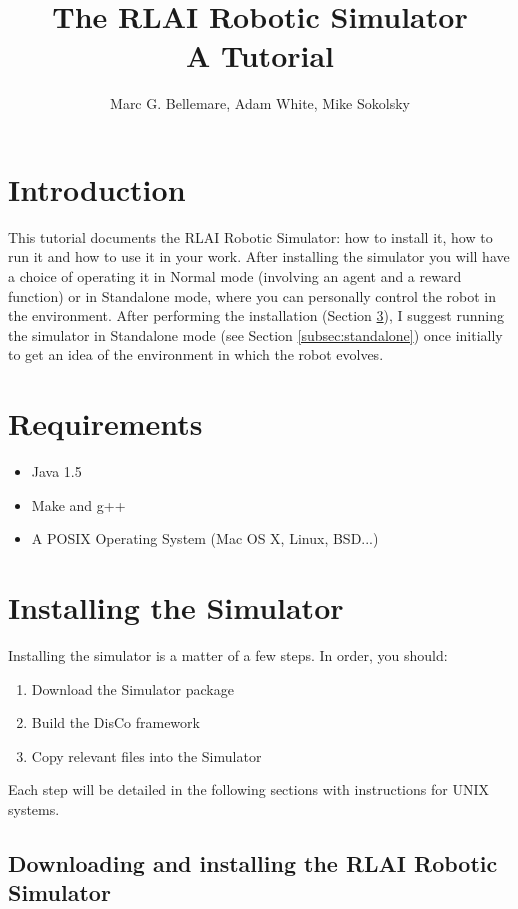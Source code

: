\documentclass[12pt]{article}
\author{Marc G. Bellemare, Adam White, Mike Sokolsky}
\title{The RLAI Robotic Simulator\\ A Tutorial}
\begin{document}
\maketitle

\section{Introduction}

This tutorial documents the RLAI Robotic Simulator: how to install it, how
to run it and how to use it in your work. After installing the simulator
you will have a choice of operating it in Normal mode (involving an agent
and a reward function) or in Standalone mode, where you can personally 
control the robot in the environment. After performing the installation
(Section \ref{sec:installation}),  I suggest running the simulator in 
Standalone mode (see Section \ref{subsec:standalone}) once initially to get
an idea of the environment in which the robot evolves. 

\section{Requirements}

\begin{itemize}
\item{Java 1.5}
\item{Make and g++}
\item{A POSIX Operating System (Mac OS X, Linux, BSD...)}
\end{itemize}

\section{Installing the Simulator}\label{sec:installation}

Installing the simulator is a matter of a few steps. In order, you should:

\begin{enumerate}
\item{Download the Simulator package}
\item{Build the DisCo framework}
\item{Copy relevant files into the Simulator}
\end{enumerate}

Each step will be detailed in the following sections with instructions for
UNIX systems.

\subsection{Downloading and installing the RLAI Robotic Simulator}
\end{document}
